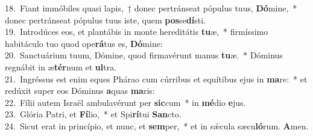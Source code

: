 {18.~}Fiant immóbiles quasi lapis,~† donec pertránseat pópulus tuus, \textbf{Dó}mine,~* donec pertránseat pópulus tuus iste, quem \textbf{pos}se\textbf{dí}sti.\\
{19.~}Introdúces eos, et plantábis in monte hereditátis \textbf{tu}æ,~* firmíssimo habitáculo tuo quod ope\textbf{rá}tus es, \textbf{Dó}mine:\\
{20.~}Sanctuárium tuum, Dómine, quod firmavérunt manus \textbf{tu}æ.~* Dóminus regnábit in æ\textbf{tér}num et \textbf{ul}tra.\\
{21.~}Ingréssus est enim eques Phárao cum cúrribus et equítibus ejus in \textbf{ma}re:~* et redúxit super eos Dóminus \textbf{a}quas \textbf{ma}ris:\\
{22.~}Fílii autem Israël ambulavérunt per \textbf{sic}cum~* in \textbf{mé}dio \textbf{e}jus.\\
{23.~}Glória Patri, et \textbf{Fí}lio,~* et Spi\textbf{rí}tui \textbf{San}cto.\\
{24.~}Sicut erat in princípio, et nunc, et \textbf{sem}per,~* et in sǽcula sæcu\textbf{ló}rum. \textbf{A}men.\\
